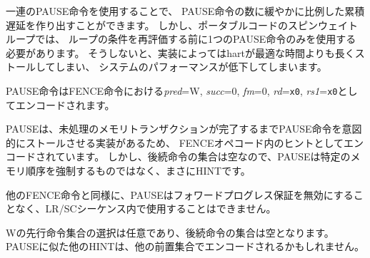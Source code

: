 \begin{commentary}
\begin{comment}
A series of PAUSE instructions can be used to create a cumulative delay loosely
proportional to the number of PAUSE instructions.
In spin-wait loops in portable code, however, only one PAUSE instruction should
be used before re-evaluating loop conditions, else the hart might stall longer
than optimal on some implementations, degrading system performance.
\end{comment}

一連のPAUSE命令を使用することで、
PAUSE命令の数に緩やかに比例した累積遅延を作り出すことができます。
しかし、ポータブルコードのスピンウェイトループでは、
ループの条件を再評価する前に1つのPAUSE命令のみを使用する必要があります。
そうしないと、実装によってはhartが最適な時間よりも長くストールしてしまい、
システムのパフォーマンスが低下してしまいます。
\end{commentary}

\begin{comment}
PAUSE is encoded as a FENCE instruction with {\em pred}=W, {\em succ}=0,
{\em fm}=0, {\em rd}={\tt x0}, and {\em rs1}={\tt x0}.
\end{comment}

PAUSE命令はFENCE命令における{\em pred}=W, {\em succ}=0, 
{\em fm}=0, {\em rd}={\tt x0}, {\em rs1}={\tt x0}としてエンコードされます。

\begin{commentary}
\begin{comment}
PAUSE is encoded as a hint within the FENCE opcode because some
implementations are expected to deliberately stall the PAUSE instruction until outstanding
memory transactions have completed.
Because the successor set is null, however, PAUSE does not {\em mandate} any
particular memory ordering---hence, it truly is a HINT.
\end{comment}

PAUSEは、未処理のメモリトランザクションが完了するまでPAUSE命令を意図的にストールさせる実装があるため、
FENCEオペコード内のヒントとしてエンコードされています。
しかし、後続命令の集合は空なので、PAUSEは特定のメモリ順序を強制するものではなく、まさにHINTです。

\begin{comment}
Like other FENCE instructions, PAUSE cannot be used within LR/SC sequences
without voiding the forward-progress guarantee.
\end{comment}

他のFENCE命令と同様に、PAUSEはフォワードプログレス保証を無効にすることなく、LR/SCシーケンス内で使用することはできません。

\begin{comment}
The choice of a predecessor set of W is arbitrary, since the successor set is
null.
Other HINTs similar to PAUSE might be encoded with other predecessor sets.
\end{comment}

Wの先行命令集合の選択は任意であり、後続命令の集合は空となります。
PAUSEに似た他のHINTは、他の前置集合でエンコードされるかもしれません。

\end{commentary}
